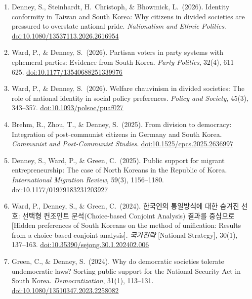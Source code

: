 \documentclass[11pt, a4paper]{article}
\begin{document}
\begin{enumerate}[itemsep=0.15em]\sloppy
  \item Denney, S., Steinhardt, H.\ Christoph, \& Bhowmick, L.\ (2026). Identity conformity in Taiwan and South Korea: Why citizens in divided societies are pressured to overstate national pride. \textit{Nationalism and Ethnic Politics}. \href{https://doi.org/10.1080/13537113.2026.2616954}{doi:10.1080/13537113.2026.2616954}

  \item Ward, P., \& Denney, S.\ (2026). Partisan voters in party systems with ephemeral parties: Evidence from South Korea. \textit{Party Politics}, 32(4), 611--625. \href{https://doi.org/10.1177/13540688251339976}{doi:10.1177/13540688251339976}

  \item Ward, P., \& Denney, S.\ (2026). Welfare chauvinism in divided societies: The role of national identity in social policy preferences. \textit{Policy and Society}, 45(3), 343--357. \href{https://doi.org/10.1093/polsoc/puaf027}{doi:10.1093/polsoc/puaf027}

  \item Brehm, R., Zhou, T., \& Denney, S.\ (2025). From division to democracy: Integration of post-communist citizens in Germany and South Korea. \textit{Communist and Post-Communist Studies}. \href{https://doi.org/10.1525/cpcs.2025.2636997}{doi:10.1525/cpcs.2025.2636997}

  \item Denney, S., Ward, P., \& Green, C.\ (2025). Public support for migrant entrepreneurship: The case of North Koreans in the Republic of Korea. \textit{International Migration Review}, 59(3), 1156--1180. \href{https://doi.org/10.1177/01979183231203927}{doi:10.1177/01979183231203927}

      \item Ward, P., Denney, S., \& Green, C.\ (2024). 한국인의 통일방식에 대한 숨겨진 선호: 선택형 컨조인트 분석(Choice-based Conjoint Analysis) 결과를 중심으로 [Hidden preferences of South Koreans on the method of unification: Results from a choice-based conjoint analysis]. \textit{국가전략} [National Strategy], 30(1), 137--163. \href{https://doi.org/10.35390/sejong.30.1.202402.006}{doi:10.35390/sejong.30.1.202402.006}

  \item Green, C., \& Denney, S.\ (2024). Why do democratic societies tolerate undemocratic laws? Sorting public support for the National Security Act in South Korea. \textit{Democratization}, 31(1), 113--131. \href{https://doi.org/10.1080/13510347.2023.2258082}{doi:10.1080/13510347.2023.2258082}


\end{enumerate}
\end{document}
